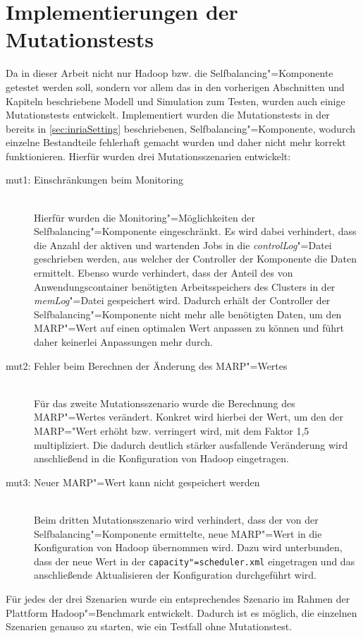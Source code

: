 \section{Implementierungen der Mutationstests}
\label{sec:implMutationTests}

Da in dieser Arbeit nicht nur Hadoop bzw. die Selfbalancing"=Komponente getestet werden soll, sondern vor allem das in den vorherigen Abschnitten und Kapiteln beschriebene Modell und Simulation zum Testen, wurden auch einige Mutationstests entwickelt.
Implementiert wurden die Mutationstests in der bereits in \autoref{sec:inriaSetting} beschriebenen, Selfbalancing"=Komponente, wodurch einzelne Bestandteile fehlerhaft gemacht wurden und daher nicht mehr korrekt funktionieren.
Hierfür wurden drei Mutationsszenarien entwickelt:

\begin{description}
    \item [mut1: Einschränkungen beim Monitoring] \hfill \\
        Hierfür wurden die Monitoring"=Möglichkeiten der Selfbalancing"=Komponente eingeschränkt.
        Es wird dabei verhindert, dass die Anzahl der aktiven und wartenden Jobs in die \emph{controlLog}"=Datei geschrieben werden, aus welcher der Controller der Komponente die Daten ermittelt.
        Ebenso wurde verhindert, dass der Anteil des von Anwendungscontainer benötigten Arbeitsspeichers des Clusters in der \emph{memLog}"=Datei gespeichert wird.
        Dadurch erhält der Controller der Selfbalancing"=Komponente nicht mehr alle benötigten Daten, um den \ac{MARP}"=Wert auf einen optimalen Wert anpassen zu können und führt daher keinerlei Anpassungen mehr durch.
    \item [mut2: Fehler beim Berechnen der Änderung des MARP"=Wertes] \hfill \\
        Für das zweite Mutationsszenario wurde die Berechnung des MARP"=Wertes verändert.
        Konkret wird hierbei der Wert, um den der MARP="Wert erhöht bzw. verringert wird, mit dem Faktor 1,5 multipliziert.
        Die dadurch deutlich stärker ausfallende Veränderung wird anschließend in die Konfiguration von Hadoop eingetragen.
    \item [mut3: Neuer MARP"=Wert kann nicht gespeichert werden] \hfill \\
        Beim dritten Mutationsszenario wird verhindert, dass der von der Selfbalancing"=Komponente ermittelte, neue MARP"=Wert in die Konfiguration von Hadoop übernommen wird.
        Dazu wird unterbunden, dass der neue Wert in der \texttt{capacity"=scheduler.xml} eingetragen und das anschließende Aktualisieren der Konfiguration durchgeführt wird.
\end{description}

Für jedes der drei Szenarien wurde ein entsprechendes Szenario im Rahmen der Plattform Hadoop"=Benchmark entwickelt.
Dadurch ist es möglich, die einzelnen Szenarien genauso zu starten, wie ein Testfall ohne Mutationstest.
